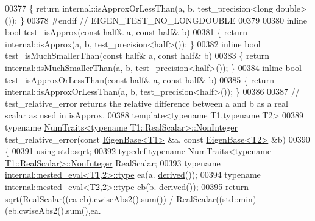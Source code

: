 \begin{DoxyCode}
00377 \{ \textcolor{keywordflow}{return} internal::isApproxOrLessThan(a, b, test\_precision<long double>()); \}
00378 \textcolor{preprocessor}{#endif // EIGEN\_TEST\_NO\_LONGDOUBLE}
00379 
00380 \textcolor{keyword}{inline} \textcolor{keywordtype}{bool} test\_isApprox(\textcolor{keyword}{const} \hyperlink{struct_eigen_1_1half}{half}& a, \textcolor{keyword}{const} \hyperlink{struct_eigen_1_1half}{half}& b)
00381 \{ \textcolor{keywordflow}{return} internal::isApprox(a, b, test\_precision<half>()); \}
00382 \textcolor{keyword}{inline} \textcolor{keywordtype}{bool} test\_isMuchSmallerThan(\textcolor{keyword}{const} \hyperlink{struct_eigen_1_1half}{half}& a, \textcolor{keyword}{const} \hyperlink{struct_eigen_1_1half}{half}& b)
00383 \{ \textcolor{keywordflow}{return} internal::isMuchSmallerThan(a, b, test\_precision<half>()); \}
00384 \textcolor{keyword}{inline} \textcolor{keywordtype}{bool} test\_isApproxOrLessThan(\textcolor{keyword}{const} \hyperlink{struct_eigen_1_1half}{half}& a, \textcolor{keyword}{const} \hyperlink{struct_eigen_1_1half}{half}& b)
00385 \{ \textcolor{keywordflow}{return} internal::isApproxOrLessThan(a, b, test\_precision<half>()); \}
00386 
00387 \textcolor{comment}{// test\_relative\_error returns the relative difference between a and b as a real scalar as used in
       isApprox.}
00388 \textcolor{keyword}{template}<\textcolor{keyword}{typename} T1,\textcolor{keyword}{typename} T2>
00389 \textcolor{keyword}{typename} \hyperlink{group___core___module_struct_eigen_1_1_num_traits}{NumTraits<typename T1::RealScalar>::NonInteger} 
      test\_relative\_error(\textcolor{keyword}{const} \hyperlink{group___core___module_struct_eigen_1_1_eigen_base}{EigenBase<T1>} &a, \textcolor{keyword}{const} \hyperlink{group___core___module_struct_eigen_1_1_eigen_base}{EigenBase<T2>} &b)
00390 \{
00391   \textcolor{keyword}{using} std::sqrt;
00392   \textcolor{keyword}{typedef} \textcolor{keyword}{typename} \hyperlink{group___core___module_struct_eigen_1_1_num_traits}{NumTraits<typename T1::RealScalar>::NonInteger}
       RealScalar;
00393   \textcolor{keyword}{typename} \hyperlink{class_eigen_1_1internal_1_1_tensor_lazy_evaluator_writable}{internal::nested\_eval<T1,2>::type} ea(a.
      \hyperlink{group___core___module_a324b16961a11d2ecfd2d1b7dd7946545}{derived}());
00394   \textcolor{keyword}{typename} \hyperlink{class_eigen_1_1internal_1_1_tensor_lazy_evaluator_writable}{internal::nested\_eval<T2,2>::type} eb(b.
      \hyperlink{group___core___module_a324b16961a11d2ecfd2d1b7dd7946545}{derived}());
00395   \textcolor{keywordflow}{return} sqrt(RealScalar((ea-eb).cwiseAbs2().sum()) / RealScalar((std::min)(eb.cwiseAbs2().sum(),ea.

\end{DoxyCode}
